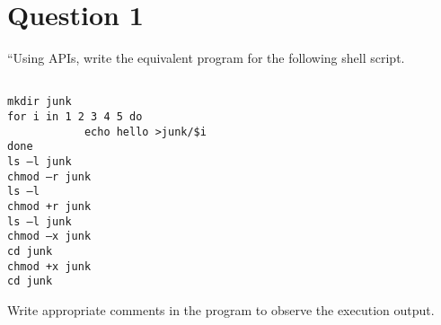 \documentclass[main.tex]{subfiles}
\begin{document}
\section{Question 1}
“Using APIs, write the equivalent program for the following shell script.
\begin{verbatim}

mkdir junk
for i in 1 2 3 4 5 do
            echo hello >junk/$i
done
ls –l junk
chmod –r junk
ls –l
chmod +r junk
ls –l junk
chmod –x junk
cd junk
chmod +x junk
cd junk
\end{verbatim}

Write appropriate comments in the program to observe the execution output.




\end{document}
